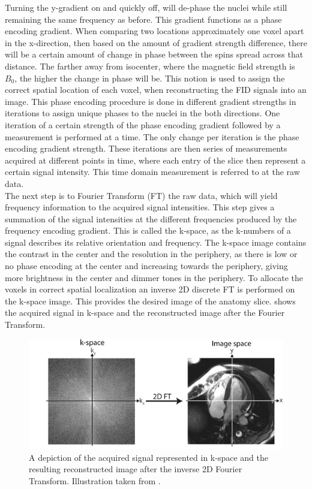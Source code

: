 Turning the y-gradient on and quickly off, will de-phase the nuclei while still remaining the same frequency as before. This gradient functions as a phase encoding gradient. When comparing two locations approximately one voxel apart in the x-direction, then based on the amount of gradient strength difference, there will be a certain amount of change in phase between the spins spread across that distance. The farther away from isocenter, where the magnetic field strength is $B_0$, the higher the change in phase will be. This notion is used to assign the correct spatial location of each voxel, when reconstructing the FID signals into an image. This phase encoding procedure is done in different gradient strengths in iterations to assign unique phases to the nuclei in the both directions. One iteration of a certain strength of the phase encoding gradient followed by a measurement is performed at a time. The only change per iteration is the phase encoding gradient strength. These iterations are then series of measurements acquired at different points in time, where each entry of the slice then represent a certain signal intensity. This time domain measurement is referred to at the raw data. \cite{Bharath2008}\\
The next step is to Fourier Transform (FT) the raw data, which will yield frequency information to the acquired signal intensities. This step gives a summation of the signal intensities at the different frequencies produced by the frequency encoding gradient. This is called the k-space, as the k-numbers of a signal describes its relative orientation and frequency. The k-space image contains the contrast in the center and the resolution in the periphery, as there is low or no phase encoding at the center and increasing towards the periphery, giving more brightness in the center and dimmer tones in the periphery. To allocate the voxels in correct spatial localization an inverse 2D discrete FT is performed on the k-space image. This provides the desired image of the anatomy slice. \cite{Bharath2008}  shows the acquired signal in k-space and the reconstructed image after the Fourier Transform. 

\begin{figure}[H]                 
	\includegraphics[width=.8\textwidth]{figures/aBackground/k_space}  
	\caption{A depiction of the acquired signal represented in k-space and the resulting reconstructed image after the inverse 2D Fourier Transform. Illustration taken from \cite{Syed2015}.}
	\label{fig:back:kspace} 
\end{figure}
